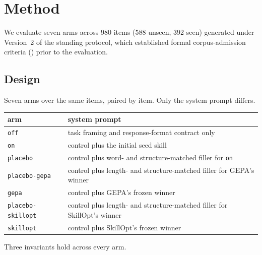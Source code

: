 \section{Method}
\label{sec:method}


We evaluate seven arms across 980 items (588 unseen, 392 seen) generated
under Version~2 of the standing protocol, which established formal
corpus-admission criteria () prior to the evaluation.

\subsection{Design}

Seven arms over the same items, paired by item. Only the system prompt differs.

\begin{center}
\begin{tabular}{ll}
\toprule
arm & system prompt \\
\midrule
\texttt{off} & task framing and response-format contract only \\
\texttt{on} & control plus the initial seed skill \\
\texttt{placebo} & control plus word- and structure-matched filler for \texttt{on} \\
\texttt{placebo-gepa} & control plus length- and structure-matched filler for GEPA's winner \\
\texttt{gepa} & control plus GEPA's frozen winner \\
\texttt{placebo-skillopt} & control plus length- and structure-matched filler for SkillOpt's winner \\
\texttt{skillopt} & control plus SkillOpt's frozen winner \\
\bottomrule
\end{tabular}
\end{center}

Three invariants hold across every arm.


